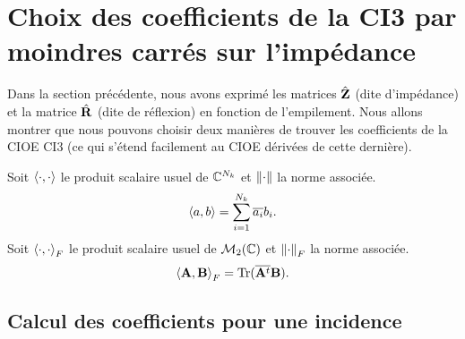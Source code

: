 \section[Choix 1 des coefficients de la CI3]{Choix des coefficients de la CI3 par moindres carrés sur l'impédance}

  Dans la section précédente, nous avons exprimé les matrices \(\hat{\mathbf{Z}}\) (dite d'impédance) et la matrice \(\hat{\mathbf{R}}\) (dite de réflexion) en fonction de l'empilement.
  Nous allons montrer que nous pouvons choisir deux manières de trouver les coefficients de la CIOE CI3 (ce qui s’étend facilement au CIOE dérivées de cette dernière). 

  \begin{defn}
    Soit \(\left<{\cdot},{\cdot}\right>\) le produit scalaire usuel de \(\mathbb C^{N_{k}}\) et \(\left\lVert\cdot\right\rVert\) la norme associée.
    \begin{equation*}
      \left<{a},{b}\right> = \sum_{i=1}^{N_k} {\overline{a_i}} b_i.
    \end{equation*}
    Soit \(\left<{\cdot},{\cdot}\right>_F\) le produit scalaire usuel de \(\mathcal{M}_2(\mathbb C)\) et \(\left\lVert\cdot\right\rVert_F\) la norme associée.
    \begin{equation*}
      \left<{\mathbf{A}},{\mathbf{B}}\right>_F = \operatorname{Tr}({\overline{\mathbf{A}^t}}\mathbf{B}).
    \end{equation*}
  \end{defn}

  \subsection{Calcul des coefficients pour une incidence}

